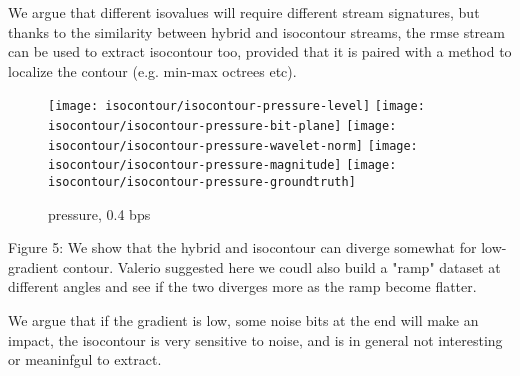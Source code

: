 We argue that different isovalues will require different stream signatures, but thanks to the
similarity between hybrid and isocontour streams, the rmse stream can be used to extract isocontour
too, provided that it is paired with a method to localize the contour (e.g. min-max octrees etc).

\begin{figure}[h]
	\centering
	{\texttt{[image: isocontour/isocontour-pressure-level]}}
	{\texttt{[image: isocontour/isocontour-pressure-bit-plane]}}
	{\texttt{[image: isocontour/isocontour-pressure-wavelet-norm]}}
	{\texttt{[image: isocontour/isocontour-pressure-magnitude]}}
	{\texttt{[image: isocontour/isocontour-pressure-groundtruth]}}
	\caption{pressure, 0.4 bps}
	\label{fig:isocontour-plots}
\end{figure}

Figure 5: We show that the hybrid and isocontour can diverge somewhat for low-gradient contour.
Valerio suggested here we coudl also build a "ramp" dataset at different angles and see if the two
diverges more as the ramp become flatter.

We argue that if the gradient is low, some noise bits at the end will make an impact, the isocontour
is very sensitive to noise, and is in general not interesting or meaninfgul to extract.
